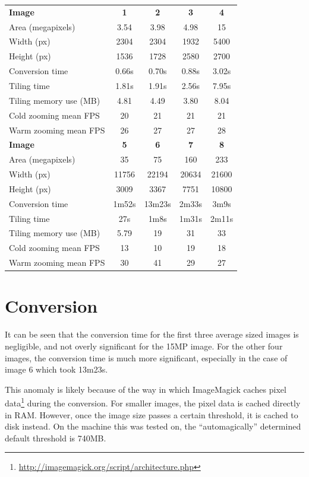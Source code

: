 \documentclass{report}
\begin{document}
  \begin{center}
  \begin{tabular}{l|c|c|c|c}
    \textbf{Image} & \textbf{1} & \textbf{2} & \textbf{3} & \textbf{4} \\
    Area (megapixels) & 3.54 & 3.98 & 4.98 & 15 \\
    Width (px) & 2304 & 2304 & 1932 & 5400 \\
    Height (px) & 1536 & 1728 & 2580 & 2700 \\
    Conversion time & 0.66s & 0.70s & 0.88s & 3.02s \\
    Tiling time & 1.81s & 1.91s & 2.56s & 7.95s \\
    Tiling memory use (MB) & 4.81 & 4.49 & 3.80 & 8.04 \\
    Cold zooming mean FPS & 20 & 21 & 21 & 21 \\
    Warm zooming mean FPS & 26 & 27 & 27 & 28 \\
    \hline
    \textbf{Image} & \textbf{5} & \textbf{6} & \textbf{7} & \textbf{8} \\
    Area (megapixels) & 35 & 75 & 160 & 233 \\
    Width (px) & 11756 & 22194 & 20634 & 21600 \\
    Height (px) & 3009 & 3367 & 7751 & 10800 \\
    Conversion time & 1m52s & 13m23s & 2m33s & 3m9s \\
    Tiling time & 27s & 1m8s & 1m31s & 2m11s \\
    Tiling memory use (MB) & 5.79 & 19 & 31 & 33 \\
    Cold zooming mean FPS & 13 & 10 & 19 & 18 \\
    Warm zooming mean FPS & 30 & 41 & 29 & 27 \\
  \end{tabular}
  \end{center}

  \section{Conversion}
  It can be seen that the conversion time for the first three average sized
  images is negligible, and not overly significant for the 15MP image. For the
  other four images, the conversion time is much more significant, especially
  in the case of image 6 which took 13m23s.

  This anomaly is likely because of the way in which ImageMagick caches pixel
  data\footnote{
    \url{http://imagemagick.org/script/architecture.php}
  } during the conversion. For smaller images, the pixel data is cached
  directly in RAM. However, once the image size passes a certain threshold,
  it is cached to disk instead. On the machine this was tested on, the
  ``automagically'' determined default threshold is 740MB.
\end{document}
